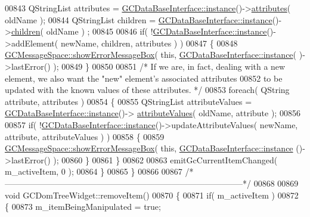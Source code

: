 \begin{DoxyCode}
00843     QStringList attributes = \hyperlink{class_g_c_data_base_interface_a1baea9c0667aa8b610ec30076fcab84c}{GCDataBaseInterface::instance}()->\hyperlink{class_g_c_data_base_interface_afb1e49e08f98ca453f9ac66340a35642}{attributes}( 
      oldName );
00844     QStringList children = \hyperlink{class_g_c_data_base_interface_a1baea9c0667aa8b610ec30076fcab84c}{GCDataBaseInterface::instance}()->\hyperlink{class_g_c_data_base_interface_aab5126783bc3acc7c718c8ffd8af62bc}{children}( oldName )
      ;
00845 
00846     \textcolor{keywordflow}{if}( !\hyperlink{class_g_c_data_base_interface_a1baea9c0667aa8b610ec30076fcab84c}{GCDataBaseInterface::instance}()->addElement( newName, children, 
      attributes ) )
00847     \{
00848       \hyperlink{namespace_g_c_message_space_ab118b3a133686167617eb955029fd44e}{GCMessageSpace::showErrorMessageBox}( \textcolor{keyword}{this}, \hyperlink{class_g_c_data_base_interface_a1baea9c0667aa8b610ec30076fcab84c}{GCDataBaseInterface::instance}(
      )->lastError() );
00849     \}
00850 
00851     \textcolor{comment}{/* If we are, in fact, dealing with a new element, we also want the "new"
       element's associated attributes}
00852 \textcolor{comment}{      to be updated with the known values of these attributes. */}
00853     \textcolor{keywordflow}{foreach}( QString attribute, attributes )
00854     \{
00855       QStringList attributeValues = \hyperlink{class_g_c_data_base_interface_a1baea9c0667aa8b610ec30076fcab84c}{GCDataBaseInterface::instance}()->
      \hyperlink{class_g_c_data_base_interface_a329e17f6c02c62fd554884f2b5a7e2df}{attributeValues}( oldName, attribute );
00856 
00857       \textcolor{keywordflow}{if}( !\hyperlink{class_g_c_data_base_interface_a1baea9c0667aa8b610ec30076fcab84c}{GCDataBaseInterface::instance}()->updateAttributeValues( newName, 
      attribute, attributeValues ) )
00858       \{
00859         \hyperlink{namespace_g_c_message_space_ab118b3a133686167617eb955029fd44e}{GCMessageSpace::showErrorMessageBox}( \textcolor{keyword}{this}, \hyperlink{class_g_c_data_base_interface_a1baea9c0667aa8b610ec30076fcab84c}{GCDataBaseInterface::instance}
      ()->lastError() );
00860       \}
00861     \}
00862 
00863     emitGcCurrentItemChanged( m\_activeItem, 0 );
00864   \}
00865 \}
00866 
00867 \textcolor{comment}{/*
      --------------------------------------------------------------------------------------*/}
00868 
00869 \textcolor{keywordtype}{void} GCDomTreeWidget::removeItem()
00870 \{
00871   \textcolor{keywordflow}{if}( m\_activeItem )
00872   \{
00873     m\_itemBeingManipulated = \textcolor{keyword}{true};

\end{DoxyCode}
